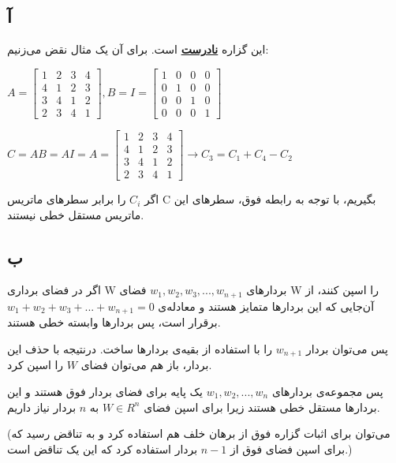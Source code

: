 \subsection*{آ}
این گزاره \underline{\textbf{نادرست}} است.
برای آن یک مثال نقض می‌زنیم:

\setLTR

$
A =
\begin{bmatrix}
	1 & 2 & 3 & 4 \\
	4 & 1 & 2 & 3 \\
	3 & 4 & 1 & 2 \\
	2 & 3 & 4 & 1
\end{bmatrix}
, B = I = 
\begin{bmatrix}
	1 & 0 & 0 & 0 \\
	0 & 1 & 0 & 0 \\
	0 & 0 & 1 & 0 \\
	0 & 0 & 0 & 1
\end{bmatrix}
$

$C = AB = AI = A =
\begin{bmatrix}
	1 & 2 & 3 & 4 \\
	4 & 1 & 2 & 3 \\
	3 & 4 & 1 & 2 \\
	2 & 3 & 4 & 1
\end{bmatrix} \longrightarrow C_{3}=C_{1} +	C_{4} - C_{2}
$
\setRTL

اگر $C_{i}$ را برابر سطرهای ماتریس C بگیریم، با توجه به رابطه فوق، سطرهای این ماتریس مستقل خطی نیستند.

\subsection*{ب}

اگر در فضای برداری W بردارهای 
$w_{1},w_{2},w_{3},...,w_{n+1}$
فضای W را اسپن کنند، از آن‌جایی که این بردارها متمایز هستند و معادله‌ی 
$w_{1}+w_{2}+w_{3}+...+w_{n+1}=0$
برقرار است، پس بردارها وابسته خطی هستند.

پس می‌توان بردار 
$w_{n+1}$
را با استفاده از بقیه‌ی بردارها ساخت. درنتیجه با حذف این بردار، باز هم می‌توان فضای $W$ را اسپن کرد.

پس مجموعه‌ی بردارهای 
$w_{1},w_{2},...,w_{n}$
یک پایه برای فضای بردار فوق هستند و این بردارها مستقل خطی هستند زیرا برای اسپن فضای 
$W \in R^n$
به $n$ بردار نیاز داریم.

(می‌توان برای اثبات گزاره فوق از برهان خلف هم استفاده کرد و به تناقض رسید که برای اسپن فضای فوق از
$n-1$
بردار استفاده کرد که این یک تناقض است.)